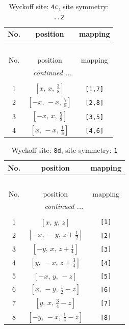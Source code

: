 \documentclass[fleqn,8pt]{jsarticle}
\begin{document}
\renewcommand{\arraystretch}{1.2}
\begin{longtable}{ccc}
\caption{Wyckoff site: {\tt 4c}, site symmetry: {\tt ..2}}
 \\
 \hline \hline
No. & position & mapping \\ \hline \endfirsthead

\multicolumn{2}{l}{\tablename\ \thetable{}} \\
 \hline \hline
No. & position & mapping \\ \hline \endhead

 \hline \hline
\multicolumn{2}{r}{\footnotesize\it continued ...} \\ \endfoot

 \hline \hline
\multicolumn{2}{r}{} \\ \endlastfoot

1 & $\left[ x,\, x,\, \frac{3}{8} \right]$ & {\tt [1,7]} \\ \hline
2 & $\left[ - x,\, - x,\, \frac{7}{8} \right]$ & {\tt [2,8]} \\ \hline
3 & $\left[ - x,\, x,\, \frac{5}{8} \right]$ & {\tt [3,5]} \\ \hline
4 & $\left[ x,\, - x,\, \frac{1}{8} \right]$ & {\tt [4,6]} \\
\end{longtable}
\renewcommand{\arraystretch}{1.2}
\begin{longtable}{ccc}
\caption{Wyckoff site: {\tt 8d}, site symmetry: {\tt 1}}
 \\
 \hline \hline
No. & position & mapping \\ \hline \endfirsthead

\multicolumn{2}{l}{\tablename\ \thetable{}} \\
 \hline \hline
No. & position & mapping \\ \hline \endhead

 \hline \hline
\multicolumn{2}{r}{\footnotesize\it continued ...} \\ \endfoot

 \hline \hline
\multicolumn{2}{r}{} \\ \endlastfoot

1 & $\left[ x,\, y,\, z \right]$ & {\tt [1]} \\ \hline
2 & $\left[ - x,\, - y,\, z + \frac{1}{2} \right]$ & {\tt [2]} \\ \hline
3 & $\left[ - y,\, x,\, z + \frac{1}{4} \right]$ & {\tt [3]} \\ \hline
4 & $\left[ y,\, - x,\, z + \frac{3}{4} \right]$ & {\tt [4]} \\ \hline
5 & $\left[ - x,\, y,\, - z \right]$ & {\tt [5]} \\ \hline
6 & $\left[ x,\, - y,\, \frac{1}{2} - z \right]$ & {\tt [6]} \\ \hline
7 & $\left[ y,\, x,\, \frac{3}{4} - z \right]$ & {\tt [7]} \\ \hline
8 & $\left[ - y,\, - x,\, \frac{1}{4} - z \right]$ & {\tt [8]} \\
\end{longtable}
\end{document}
